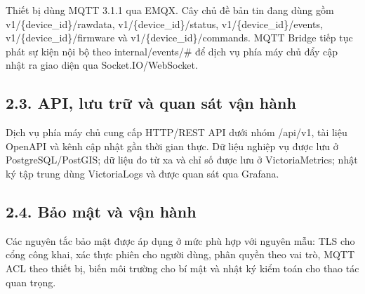 \documentclass[a4paper]{extarticle}
\newcommand{\thesisterm}[1]{{\rmfamily #1}}
\begin{document}
Thiết bị dùng MQTT 3.1.1 qua EMQX. Cây chủ đề bản tin đang dùng gồm
\thesisterm{v1/\{device\_id\}/rawdata}, \thesisterm{v1/\{device\_id\}/status},
\thesisterm{v1/\{device\_id\}/events}, \thesisterm{v1/\{device\_id\}/firmware}
và \thesisterm{v1/\{device\_id\}/commands}. MQTT Bridge tiếp tục phát sự kiện
nội bộ theo \thesisterm{internal/events/\#} để dịch vụ phía máy chủ đẩy cập nhật
ra giao diện qua Socket.IO/WebSocket.

\subsection{2.3. API, lưu trữ và quan sát vận hành}\label{app2-api-storage-standards}

Dịch vụ phía máy chủ cung cấp HTTP/REST API dưới nhóm \thesisterm{/api/v1}, tài
liệu OpenAPI và kênh cập nhật gần thời gian thực. Dữ liệu nghiệp vụ được lưu ở
PostgreSQL/PostGIS; dữ liệu đo từ xa và chỉ số được lưu ở VictoriaMetrics; nhật
ký tập trung dùng VictoriaLogs và được quan sát qua Grafana.

\subsection{2.4. Bảo mật và vận hành}\label{app2-security-operations-standards}

Các nguyên tắc bảo mật được áp dụng ở mức phù hợp với nguyên mẫu: TLS cho cổng
công khai, xác thực phiên cho người dùng, phân quyền theo vai trò, MQTT ACL theo
thiết bị, biến môi trường cho bí mật và nhật ký kiểm toán cho thao tác quan
trọng.
\end{document}
